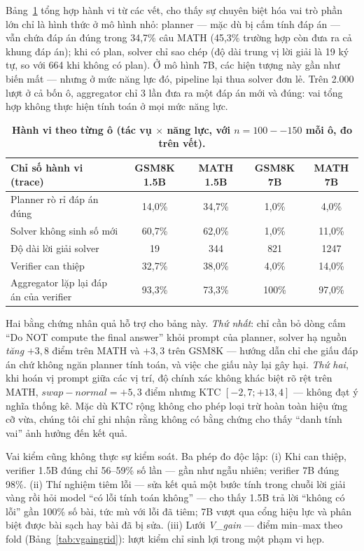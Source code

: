 \documentclass[12pt,a4paper]{article}
\begin{document}
Bảng~\ref{tab:behavior} tổng hợp hành vi từ các vết, cho thấy sự chuyên biệt hóa vai trò phần lớn chỉ là hình thức ở mô hình nhỏ: planner --- mặc dù bị cấm tính đáp án --- vẫn chứa đáp án đúng trong 34,7\% câu MATH (45,3\% trường hợp còn đưa ra cả khung đáp án); khi có plan, solver chỉ sao chép (độ dài trung vị lời giải là 19 ký tự, so với 664 khi không có plan). Ở mô hình 7B, các hiện tượng này gần như biến mất --- nhưng ở mức năng lực đó, pipeline lại thua solver đơn lẻ. Trên 2.000 lượt ở cả bốn ô, aggregator chỉ 3 lần đưa ra một đáp án mới và đúng: vai tổng hợp không thực hiện tính toán ở mọi mức năng lực.

\begin{table}[h]\centering\small
\begin{tabular}{@{}l c c c c@{}}
\toprule
Chỉ số hành vi (trace) & GSM8K 1.5B & MATH 1.5B & GSM8K 7B & MATH 7B\\
\midrule
Planner rò rỉ đáp án đúng & 14,0\% & 34,7\% & 1,0\% & 4,0\%\\
Solver không sinh số mới & 60,7\% & 62,0\% & 1,0\% & 11,0\%\\
Độ dài lời giải solver & 19 & 344 & 821 & 1247\\
Verifier can thiệp & 32,7\% & 38,0\% & 4,0\% & 14,0\%\\
Aggregator lặp lại đáp án của verifier & 93,3\% & 73,3\% & 100\% & 97,0\%\\
\bottomrule
\end{tabular}
\caption{\textbf{Hành vi theo từng ô (tác vụ \(\times\) năng lực, với \(n=100--150\) mỗi ô, đo trên vết).}}
\label{tab:behavior}
\end{table}

Hai bằng chứng nhân quả hỗ trợ cho bảng này. \textit{Thứ nhất}: chỉ cần bỏ dòng cấm ``Do NOT compute the final answer'' khỏi prompt của planner, solver hạ nguồn \textit{tăng} \(+3{,}8\) điểm trên MATH và \(+3{,}3\) trên GSM8K --- hướng dẫn chỉ che giấu đáp án chứ không ngăn planner tính toán, và việc che giấu này lại gây hại. \textit{Thứ hai}, khi hoán vị prompt giữa các vị trí, độ chính xác không khác biệt rõ rệt trên MATH, \(\textit{swap}-\textit{normal} = +5{,}3\) điểm nhưng KTC \([-2{,}7;+13{,}4]\) --- không đạt ý nghĩa thống kê. Mặc dù KTC rộng không cho phép loại trừ hoàn toàn hiệu ứng cỡ vừa, chúng tôi chỉ ghi nhận rằng không có bằng chứng cho thấy ``danh tính vai'' ảnh hưởng đến kết quả.

Vai kiểm cũng không thực sự kiểm soát. Ba phép đo độc lập: (i) Khi can thiệp, verifier 1.5B đúng chỉ 56--59\% số lần --- gần như ngẫu nhiên; verifier 7B đúng 98\%. (ii) Thí nghiệm tiêm lỗi --- sửa kết quả một bước tính trong chuỗi lời giải vàng rồi hỏi model ``có lỗi tính toán không'' --- cho thấy 1.5B trả lời ``không có lỗi'' gần 100\% số bài, tức mù với lỗi đã tiêm; 7B vượt qua cổng hiệu lực và phân biệt được bài sạch hay bài đã bị sửa. (iii) Lưới \textit{V\_gain} --- điểm min–max theo fold (Bảng~\ref{tab:vgaingrid}): lượt kiểm chỉ sinh lợi trong một phạm vi hẹp.
\end{document}
